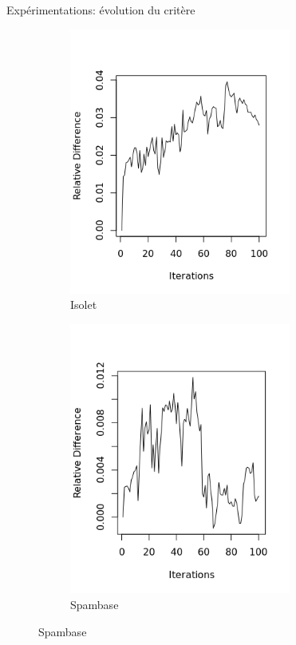 \documentclass[hyperref={pdfpagelabels=false}]{beamer}
\begin{document}
\begin{frame}{Expérimentations: évolution du critère}
\begin{figure}[!h]
\begin{subfigure}[b]{0.32\textwidth}
                \includegraphics[width=0.8\textwidth]{isolet_RD2}
                \caption{Isolet}
            \end{subfigure}
            \begin{subfigure}[b]{0.32\textwidth}
                \centering
                \includegraphics[width=0.8\textwidth]{spambase_RD3.png}
                \caption{Spambase}
            \end{subfigure}
        \end{figure}


\end{frame}
\end{document}
